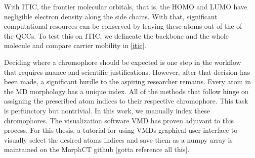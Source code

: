 With ITIC, the frontier molecular orbitals, that is, the HOMO
and LUMO have negligible electron density along the side chains. With that, significant computational resources 
can be conserved by leaving these atoms out of the of the QCCs. 
To test this on ITIC, we delineate the backbone and the whole molecule and compare carrier mobility in \autoref{itic}. 

Deciding where a chromophore should be expected is one step in the workflow that requires nuance and scientific justifications.  
However, after that decision has been made, a significant hurdle to the aspiring researcher remains. 
Every atom in the MD morphology has a unique index. All of the methods that follow hinge on assigning the prescribed atom indices to their respective chromophore. 
This task is perfunctory but nontrivial. 
In this work, we manually index these chromophores. The visualization software VMD has proven
adjuvant to this process. For this thesis, a tutorial for using VMDs graphical user interface to visually select the desired
atoms indices and save them as a numpy array is maintained on the MorphCT github [gotta reference all this]. 



